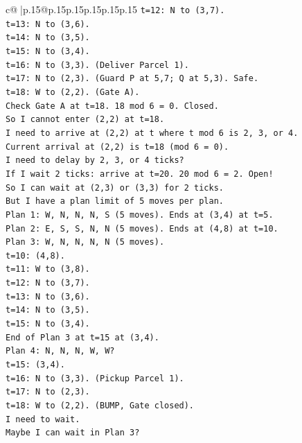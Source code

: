 \documentclass{article}
\begin{document}
{\begin{supertabular}{c@{$\;$}|p{.15\linewidth}@{}p{.15\linewidth}p{.15\linewidth}p{.15\linewidth}p{.15\linewidth}p{.15\linewidth}}
{{{\texttt{t=12: N to (3,7).} \\
\texttt{t=13: N to (3,6).} \\
\texttt{t=14: N to (3,5).} \\
\texttt{t=15: N to (3,4).} \\
\texttt{t=16: N to (3,3). (Deliver Parcel 1).} \\
\texttt{t=17: N to (2,3). (Guard P at 5,7; Q at 5,3). Safe.} \\
\texttt{t=18: W to (2,2). (Gate A).} \\
\texttt{Check Gate A at t=18. 18 mod 6 = 0. Closed.} \\
\texttt{So I cannot enter (2,2) at t=18.} \\
\texttt{I need to arrive at (2,2) at t where t mod 6 is 2, 3, or 4.} \\
\texttt{Current arrival at (2,2) is t=18 (mod 6 = 0).} \\
\texttt{I need to delay by 2, 3, or 4 ticks?} \\
\texttt{If I wait 2 ticks: arrive at t=20. 20 mod 6 = 2. Open!} \\
\texttt{So I can wait at (2,3) or (3,3) for 2 ticks.} \\
\texttt{But I have a plan limit of 5 moves per plan.} \\
\texttt{Plan 1: W, N, N, N, S (5 moves). Ends at (3,4) at t=5.} \\
\texttt{Plan 2: E, S, S, N, N (5 moves). Ends at (4,8) at t=10.} \\
\texttt{Plan 3: W, N, N, N, N (5 moves).} \\
\texttt{t=10: (4,8).} \\
\texttt{t=11: W to (3,8).} \\
\texttt{t=12: N to (3,7).} \\
\texttt{t=13: N to (3,6).} \\
\texttt{t=14: N to (3,5).} \\
\texttt{t=15: N to (3,4).} \\
\texttt{End of Plan 3 at t=15 at (3,4).} \\
\texttt{Plan 4: N, N, N, W, W?} \\
\texttt{t=15: (3,4).} \\
\texttt{t=16: N to (3,3). (Pickup Parcel 1).} \\
\texttt{t=17: N to (2,3).} \\
\texttt{t=18: W to (2,2). (BUMP, Gate closed).} \\
\texttt{I need to wait.} \\
\texttt{Maybe I can wait in Plan 3?} \\
}}}
\end{supertabular}}
\end{document}
